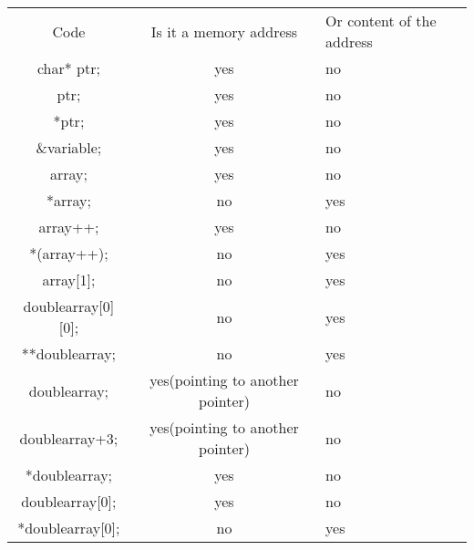 \documentclass{article}
\begin{document}
\begin{table}[h]
\centering
\begin{tabular}{ccl}
Code                                           & Is it a memory address                               & Or content of the address \\
char* ptr;                                     & yes                                            & no                        \\
ptr;                                           & yes                                                  & no                        \\
*ptr;                                          & yes                                                  & no                        \\
\&variable;                                    & yes                                                  & no                        \\
array;                                         & yes                                                  & no                        \\
*array;                                        & no                                                   & yes                       \\
array++;                                       & yes                                                  & no                        \\
*(array++);                                    & no                                                   & yes                       \\
array{[}1{]};                                  & no                                                   & yes                       \\
doublearray{[}0{]}{[}0{]};					   & no						                              & yes                       \\
**doublearray;           					   & no						                              & yes                       \\
doublearray;               					   & yes(pointing to another pointer)				   	  & no                        \\
doublearray+3;             					   & yes(pointing to another pointer)                     & no                        \\
*doublearray;            					   & yes                         					      & no                        \\
doublearray{[}0{]};       					   & yes                             				 	  & no                        \\
*doublearray{[}0{]};    			      	   & no                              					  & yes                       \\                       
\end{tabular}
\end{table}
\end{document}
